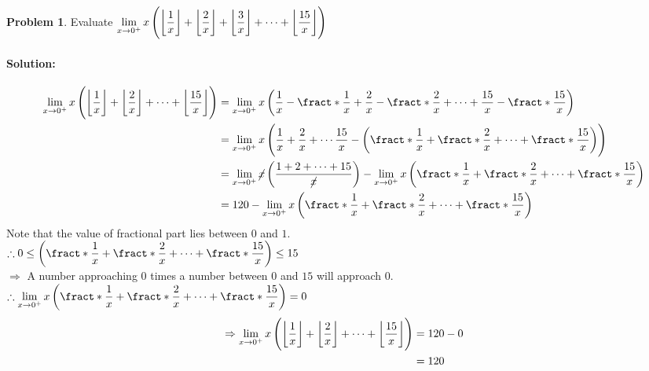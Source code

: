 \documentclass[14]{article}
\DeclarePairedDelimiter\floor{\lfloor}{\rfloor}
\DeclarePairedDelimiter\fract\{\}
\theoremstyle{definition}
\newtheorem{prob}{Problem}
\theoremstyle{case}
\begin{document}
\begin{prob}
Evaluate $\lim\limits_{x \to 0^+} x\left( \floor*{\dfrac{1}{x}} + \floor*{\dfrac{2}{x}}  + \floor*{\dfrac{3}{x}} + \cdots + \floor*{\dfrac{15}{x}}\right)$
\paragraph{Solution:}
\begin{align*}
\lim\limits_{x \to 0^+} x\left( \floor*{\dfrac{1}{x}} + \floor*{\dfrac{2}{x}} + \cdots + \floor*{\dfrac{15}{x}}\right) &= \lim\limits_{x \to 0^+} x \left( \dfrac{1}{x} - \fract*{\dfrac1x} + \dfrac2x - \fract*{\dfrac2x} + \cdots + \dfrac{15}{x} - \fract*{\dfrac{15}x} \right)\\
&= \lim\limits_{x \to 0^+} x\left( \dfrac1x + \dfrac2x + \cdots \dfrac{15}{x} - \left( \fract*{\dfrac1x} + \fract*{\dfrac2x} + \cdots + \fract*{\dfrac{15}{x}} \right) \right)\\
&= \lim\limits_{x \to 0^+} \cancel x \left( \dfrac{1 + 2  + \cdots + 15}{\cancel x} \right) - \lim\limits_{x \to 0^+} x \left( \fract*{\dfrac1x} + \fract*{\dfrac2x} + \cdots + \fract*{\dfrac{15}{x}} \right)\\
&= 120 - \lim\limits_{x \to 0^+} x \left( \fract*{\dfrac1x} + \fract*{\dfrac2x} + \cdots + \fract*{\dfrac{15}{x}} \right)\\
\end{align*}
Note that the value of fractional part lies between $0$ and $1$.\\
$\therefore 0 \leq \left( \fract*{\dfrac1x} + \fract*{\dfrac2x} + \cdots + \fract*{\dfrac{15}{x}} \right) \leq 15$\\
$\Rightarrow$ A number approaching $0$ times a number between $0$ and $15$ will approach $0$.\\
$\therefore \lim\limits_{x \to 0^+} x \left( \fract*{\dfrac1x} + \fract*{\dfrac2x} + \cdots + \fract*{\dfrac{15}{x}} \right) = 0$
\begin{align*}
\Rightarrow \lim\limits_{x \to 0^+} x\left( \floor*{\dfrac{1}{x}} + \floor*{\dfrac{2}{x}} + \cdots + \floor*{\dfrac{15}{x}}\right) &= 120 -0\\
&= 120
\end{align*}
\end{prob}
\end{document}
